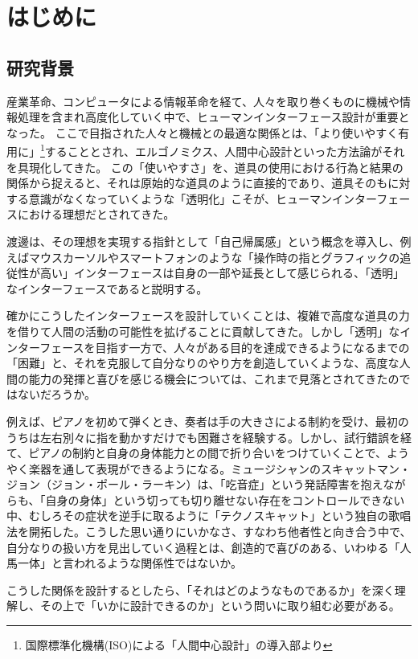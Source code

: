 \chapter{はじめに}
\label{introduction}

\section{研究背景}
\label{subject}

産業革命、コンピュータによる情報革命を経て、人々を取り巻くものに機械や情報処理を含まれ高度化していく中で、ヒューマンインターフェース設計が重要となった。
ここで目指された人々と機械との最適な関係とは、「より使いやすく有用に」\footnote{国際標準化機構(ISO)による「人間中心設計」の導入部\cite{hcd}より}することとされ、エルゴノミクス、人間中心設計といった方法論がそれを具現化してきた。
この「使いやすさ」を、道具の使用における行為と結果の関係から捉えると、それは原始的な道具のように直接的であり、道具そのもに対する意識がなくなっていくような「透明化」こそが、ヒューマンインターフェースにおける理想だとされてきた。

渡邊は、その理想を実現する指針として「自己帰属感」という概念を導入し、例えばマウスカーソルやスマートフォンのような「操作時の指とグラフィックの追従性が高い」インターフェースは自身の一部や延長として感じられる、「透明」なインターフェースであると説明する。

確かにこうしたインターフェースを設計していくことは、複雑で高度な道具の力を借りて人間の活動の可能性を拡げることに貢献してきた。しかし「透明」なインターフェースを目指す一方で、人々がある目的を達成できるようになるまでの「困難」と、それを克服して自分なりのやり方を創造していくような、高度な人間の能力の発揮と喜びを感じる機会については、これまで見落とされてきたのではないだろうか。

例えば、ピアノを初めて弾くとき、奏者は手の大きさによる制約を受け、最初のうちは左右別々に指を動かすだけでも困難さを経験する。しかし、試行錯誤を経て、ピアノの制約と自身の身体能力との間で折り合いをつけていくことで、ようやく楽器を通して表現ができるようになる。ミュージシャンのスキャットマン・ジョン（ジョン・ポール・ラーキン）は、「吃音症」という発話障害を抱えながらも、「自身の身体」という切っても切り離せない存在をコントロールできない中、むしろその症状を逆手に取るように「テクノスキャット」という独自の歌唱法を開拓した。こうした思い通りにいかなさ、すなわち他者性と向き合う中で、自分なりの扱い方を見出していく過程とは、創造的で喜びのある、いわゆる「人馬一体」と言われるような関係性ではないか。

こうした関係を設計するとしたら、「それはどのようなものであるか」を深く理解し、その上で「いかに設計できるのか」という問いに取り組む必要がある。

